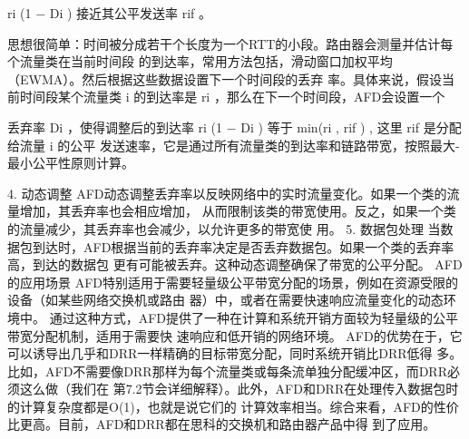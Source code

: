    ri (1 − Di ) 接近其公平发送率 rif 。
     ​       ​               ​




思想很简单：时间被分成若干个长度为一个RTT的小段。路由器会测量并估计每个流量类在当前时间段
的到达率，常用方法包括，滑动窗口加权平均（EWMA）。然后根据这些数据设置下一个时间段的丢弃
率。具体来说，假设当前时间段某个流量类 i 的到达率是 ri ，那么在下一个时间段，AFD会设置一个
                                         ​




丢弃率 Di ，使得调整后的到达率 ri (1 − Di ) 等于 min(ri , rif ) , 这里 rif 是分配给流量 i 的公平
发送速率，它是通过所有流量类的到达率和链路带宽，按照最大-最小公平性原则计算。
         ​               ​       ​           ​   ​   ​




4. 动态调整
AFD动态调整丢弃率以反映网络中的实时流量变化。如果一个类的流量增加，其丢弃率也会相应增加，
从而限制该类的带宽使用。反之，如果一个类的流量减少，其丢弃率也会减少，以允许更多的带宽使
用。
5. 数据包处理
当数据包到达时，AFD根据当前的丢弃率决定是否丢弃数据包。如果一个类的丢弃率高，到达的数据包
更有可能被丢弃。这种动态调整确保了带宽的公平分配。
AFD的应用场景
AFD特别适用于需要轻量级公平带宽分配的场景，例如在资源受限的设备（如某些网络交换机或路由
器）中，或者在需要快速响应流量变化的动态环境中。
通过这种方式，AFD提供了一种在计算和系统开销方面较为轻量级的公平带宽分配机制，适用于需要快
速响应和低开销的网络环境。
    AFD的优势在于，它可以诱导出几乎和DRR一样精确的目标带宽分配，同时系统开销比DRR低得
多。比如，AFD不需要像DRR那样为每个流量类或每条流单独分配缓冲区，而DRR必须这么做（我们在
第7.2节会详细解释）。此外，AFD和DRR在处理传入数据包时的计算复杂度都是O(1)，也就是说它们的
计算效率相当。综合来看，AFD的性价比更高。目前，AFD和DRR都在思科的交换机和路由器产品中得
到了应用。

